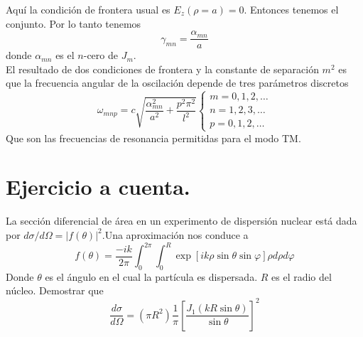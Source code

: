 Aquí la condición de frontera usual es $E_{z}(\rho =a)=0$. Entonces tenemos el conjunto. Por lo tanto tenemos
\begin{equation}
\gamma_{mn} = \dfrac{\alpha_{mn}}{a}
\label{eq:ecuacion_11_43}
\end{equation}
donde $\alpha_{mn}$ es el $n$-cero de $J_{m}$.
\\
El resultado de dos condiciones de frontera y la constante de separación $m^{2}$ es que la frecuencia angular de la oscilación depende de tres parámetros discretos
\begin{equation}
\omega_{mnp} = c \sqrt{\dfrac{\alpha^{2}_{mn}}{a^{2}} + \dfrac{p^{2} \pi^{2}}{l^{2}}} 
\begin{cases}
m = 0,1,2, \ldots \\
n = 1,2,3, \ldots \\
p = 0,1,2, \ldots
\end{cases}
\label{eq:ecuacion_11_44}
\end{equation}
Que son las frecuencias de resonancia permitidas para el modo TM.
\section{Ejercicio a cuenta.}
La sección diferencial de área en un experimento de dispersión nuclear está dada por $d \sigma / d \Omega = \vert f(\theta) \vert^{2}$.Una aproximación nos conduce a
\[ f(\theta) = \dfrac{-ik}{2 \pi} \int_{0}^{2\pi} \int_{0}^{R} \exp[ik \rho \sin \theta \sin \varphi] \rho d \rho d \varphi \]
Donde $\theta$ es el ángulo en el cual la partícula es dispersada. $R$ es el radio del núcleo. Demostrar que
\[ \dfrac{d \sigma}{d \Omega} = (\pi R^{2}) \dfrac{1}{\pi} \left[ \dfrac{J_{1} (k R \sin \theta)}{\sin \theta} \right]^{2} \]

